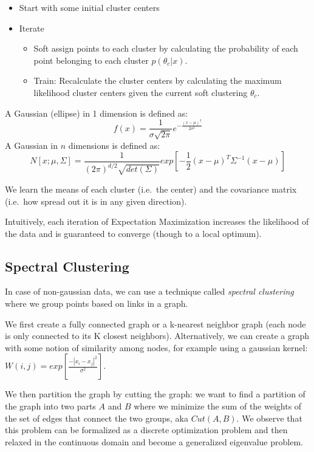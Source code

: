 \documentclass{article}
\begin{document}
\begin{itemize}
\tightlist
\item
  Start with some initial cluster centers
\item
  Iterate

  \begin{itemize}
  \tightlist
  \item
    Soft assign points to each cluster by calculating the probability of
    each point belonging to each cluster \(p(\theta _c | x)\).
  \item
    Train: Recalculate the cluster centers by calculating the maximum
    likelihood cluster centers given the current soft clustering
    \(\theta _c\).
  \end{itemize}
\end{itemize}

A Gaussian (ellipse) in 1 dimension is defined as:
\[f(x)=\frac{1}{\sigma \sqrt{2\pi}}e^{-\frac{(x-\mu)^2}{2\sigma ^2}}\] A
Gaussian in \(n\) dimensions is defined as:
\[N[x;\mu , \Sigma] = \frac{1}{(2\pi)^{d/2}\sqrt{det(\Sigma)}}exp[-\frac{1}{2}(x-\mu)^T\Sigma ^{-1}(x-\mu)]\]

We learn the means of each cluster (i.e.~the center) and the covariance
matrix (i.e.~how spread out it is in any given direction).

Intuitively, each iteration of Expectation Maximization increases the
likelihood of the data and is guaranteed to converge (though to a local
optimum).

\subsection{Spectral Clustering}\label{spectral-clustering}

In case of non-gaussian data, we can use a technique called
\emph{spectral clustering} where we group points based on links in a
graph.

We first create a fully connected graph or a k-nearest neighbor graph
(each node is only connected to its K closest neighbors). Alternatively,
we can create a graph with some notion of similarity among nodes, for
example using a gaussian kernel:
\(W(i, j)=exp[\frac{-|x_i-x_j|^2}{\sigma ^2}]\).

We then partition the graph by cutting the graph: we want to find a
partition of the graph into two parts \(A\) and \(B\) where we minimize
the sum of the weights of the set of edges that connect the two groups,
aka \(Cut(A, B)\). We observe that this problem can be formalized as a
discrete optimization problem and then relaxed in the continuous domain
and become a generalized eigenvalue problem.
\end{document}

